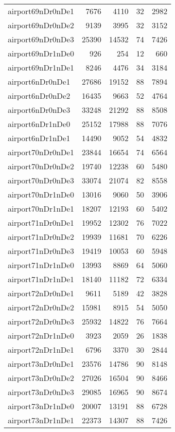 \begin{longtable}{lrrrr}
airport69nDr0nDe1 & 7676 & 4110 & 32 & 2982 \\
airport69nDr0nDe2 & 9139 & 3995 & 32 & 3152 \\
airport69nDr0nDe3 & 25390 & 14532 & 74 & 7426 \\
airport69nDr1nDe0 & 926 & 254 & 12 & 660 \\
airport69nDr1nDe1 & 8246 & 4476 & 34 & 3184 \\
airport6nDr0nDe1 & 27686 & 19152 & 88 & 7894 \\
airport6nDr0nDe2 & 16435 & 9663 & 52 & 4764 \\
airport6nDr0nDe3 & 33248 & 21292 & 88 & 8508 \\
airport6nDr1nDe0 & 25152 & 17988 & 88 & 7076 \\
airport6nDr1nDe1 & 14490 & 9052 & 54 & 4832 \\
airport70nDr0nDe1 & 23844 & 16654 & 74 & 6564 \\
airport70nDr0nDe2 & 19740 & 12238 & 60 & 5480 \\
airport70nDr0nDe3 & 33074 & 21074 & 82 & 8558 \\
airport70nDr1nDe0 & 13016 & 9060 & 50 & 3906 \\
airport70nDr1nDe1 & 18207 & 12193 & 60 & 5402 \\
airport71nDr0nDe1 & 19952 & 12302 & 76 & 7022 \\
airport71nDr0nDe2 & 19939 & 11681 & 70 & 6226 \\
airport71nDr0nDe3 & 19419 & 10053 & 60 & 5948 \\
airport71nDr1nDe0 & 13993 & 8869 & 64 & 5060 \\
airport71nDr1nDe1 & 18140 & 11182 & 72 & 6334 \\
airport72nDr0nDe1 & 9611 & 5189 & 42 & 3828 \\
airport72nDr0nDe2 & 15981 & 8915 & 54 & 5050 \\
airport72nDr0nDe3 & 25932 & 14822 & 76 & 7664 \\
airport72nDr1nDe0 & 3923 & 2059 & 26 & 1838 \\
airport72nDr1nDe1 & 6796 & 3370 & 30 & 2844 \\
airport73nDr0nDe1 & 23576 & 14786 & 90 & 8148 \\
airport73nDr0nDe2 & 27026 & 16504 & 90 & 8466 \\
airport73nDr0nDe3 & 29085 & 16965 & 90 & 8674 \\
airport73nDr1nDe0 & 20007 & 13191 & 88 & 6728 \\
airport73nDr1nDe1 & 22373 & 14307 & 88 & 7426 \\

\end{longtable}
